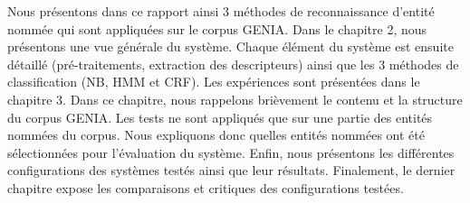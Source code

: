 Nous présentons dans ce rapport ainsi 3 méthodes de reconnaissance d'entité nommée qui sont appliquées sur le corpus GENIA. Dans le chapitre 2, nous présentons une vue générale du système. Chaque élément du système est ensuite détaillé (pré-traitements, extraction des descripteurs) ainsi que les 3 méthodes de classification (NB, HMM et CRF). Les expériences sont présentées dans le chapitre 3. Dans ce chapitre, nous rappelons brièvement le contenu et la structure du corpus GENIA. Les tests ne sont appliqués que sur une partie des entités nommées du corpus. Nous expliquons donc quelles entités nommées ont été sélectionnées pour l'évaluation du système. Enfin, nous présentons les différentes configurations des systèmes testés ainsi que leur résultats. Finalement, le dernier chapitre expose les comparaisons et critiques des configurations testées.